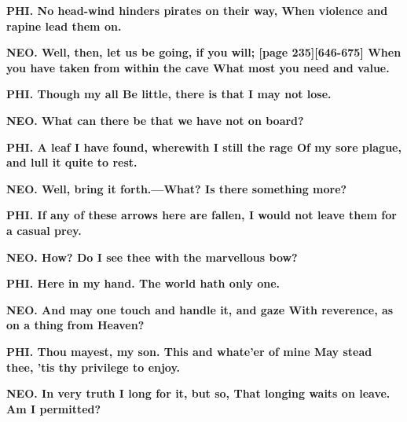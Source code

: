 \documentclass[11pt,letter]{book}
\begin{document}
\par \textbf{PHI. No head-wind hinders pirates on their way, When violence and rapine lead them on.}
\par 

\par \textbf{NEO. Well, then, let us be going, if you will; [page 235][646-675] When you have taken from within the cave What most you need and value.}
\par 

\par \textbf{PHI. Though my all Be little, there is that I may not lose.}
\par 

\par \textbf{NEO. What can there be that we have not on board?}
\par 

\par \textbf{PHI. A leaf I have found, wherewith I still the rage Of my sore plague, and lull it quite to rest.}
\par 

\par \textbf{NEO. Well, bring it forth.—What? Is there something more?}
\par 

\par \textbf{PHI. If any of these arrows here are fallen, I would not leave them for a casual prey.}
\par 

\par \textbf{NEO. How? Do I see thee with the marvellous bow?}
\par 

\par \textbf{PHI. Here in my hand. The world hath only one.}
\par 

\par \textbf{NEO. And may one touch and handle it, and gaze With reverence, as on a thing from Heaven?}
\par 

\par \textbf{PHI. Thou mayest, my son. This and whate’er of mine May stead thee, ’tis thy privilege to enjoy.}
\par 

\par \textbf{NEO. In very truth I long for it, but so, That longing waits on leave. Am I permitted?}
\par 
\end{document}

